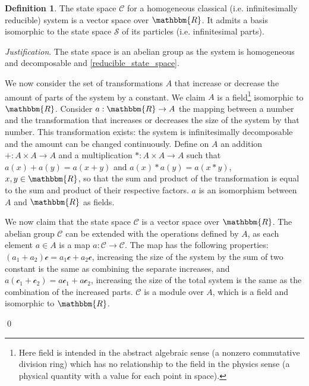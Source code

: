 \documentclass[aps,pra,10pt,twocolumn,floatfix,nofootinbib]{revtex4-1}
\theoremstyle{definition}
\newtheorem{defn}[prop]{Definition}
\newenvironment{justification}{\emph{Justification}.}{\qed}
\begin{document}
\begin{defn}\label{classical_vector space}
The state space $\mathcal{C}$ for a homogeneous classical (i.e. infinitesimally reducible) system is a vector space over $\mathbbm{R}$. It admits a basis isomorphic to the state space $\mathcal{S}$ of its particles (i.e. infinitesimal parts).
\end{defn}

\begin{justification}
The state space is an abelian group as the system is homogeneous and decomposable and \ref{reducible_state_space}.

We now consider the set of transformations $A$ that increase or decrease the amount of parts of the system by a constant. We claim $A$ is a field\footnote{Here field is intended in the abstract algebraic sense (a nonzero commutative division ring) which has no relationship to the field in the physics sense (a physical quantity with a value for each point in space).} isomorphic to $\mathbbm{R}$. Consider $a: \mathbbm{R} \rightarrow A$ the mapping between a number and the transformation that increases or decreases the size of the system by that number. This transformation exists: the system is infinitesimally decomposable and the amount can be changed continuously. Define on $A$ an addition $+: A \times A \rightarrow A$ and a multiplication $*: A \times A \rightarrow A$ such that $a(x) + a(y) = a(x+y)$ and $a(x) * a(y) = a(x*y)$, $x,y \in \mathbbm{R}$, so that the sum and product of the transformation is equal to the sum and product of their respective factors. $a$ is an isomorphism between $A$ and $\mathbbm{R}$ as fields.

We now claim that the state space $\mathcal{C}$ is a vector space over $\mathbbm{R}$. The abelian group $\mathcal{C}$ can be extended with the operations defined by $A$, as each element $a \in A$ is a map $a : \mathcal{C} \rightarrow \mathcal{C}$. The map has the following properties: $(a_1 + a_2) \mathcal{c} = a_1 \mathcal{c} + a_2 \mathcal{c}$, increasing the size of the system by the sum of two constant is the same as combining the separate increases, and $a (\mathcal{c}_1 + \mathcal{c}_2) = a \mathcal{c}_1 + a \mathcal{c}_2$, increasing the size of the total system is the same as the combination of the increased parts. $\mathcal{C}$ is a module over $A$, which is a field and isomorphic to $\mathbbm{R}$.


\end{justification}
\end{document}
